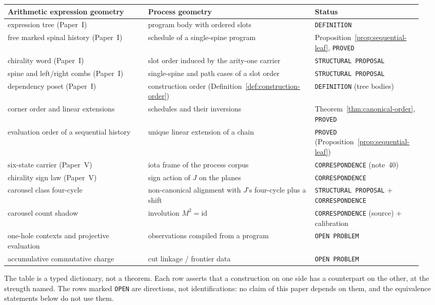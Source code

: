 \begin{center}
\footnotesize
\begin{longtable}{@{}>{\raggedright\arraybackslash}p{0.32\linewidth}>{\raggedright\arraybackslash}p{0.38\linewidth}>{\raggedright\arraybackslash}p{0.24\linewidth}@{}}
\toprule
Arithmetic expression geometry & Process geometry & Status \\
\midrule
expression tree (Paper~I) & program body with ordered slots
  & \texttt{DEFINITION} \\
free marked spinal history (Paper~I) & schedule of a single-spine program
  & Proposition~\ref{prop:sequential-leaf}, \texttt{PROVED} \\
chirality word (Paper~I) & slot order induced by the arity-one carrier
  & \texttt{STRUCTURAL PROPOSAL} \\
spine and left/right combs (Paper~I) & single-spine and path cases of a slot order
  & \texttt{STRUCTURAL PROPOSAL} \\
dependency poset (Paper~I) & construction order (Definition~\ref{def:construction-order})
  & \texttt{DEFINITION} (tree bodies) \\
corner order and linear extensions & schedules and their inversions
  & Theorem~\ref{thm:canonical-order}, \texttt{PROVED} \\
evaluation order of a sequential history & unique linear extension of a chain
  & \texttt{PROVED} (Proposition~\ref{prop:sequential-leaf}) \\
six-state carrier (Paper~V) & iota frame of the process corpus
  & \texttt{CORRESPONDENCE} (note~40) \\
chirality sign law (Paper~V) & sign action of $J$ on the planes
  & \texttt{CORRESPONDENCE} \\
carousel class four-cycle & non-canonical alignment with $J$'s four-cycle plus a shift
  & \texttt{STRUCTURAL PROPOSAL} + \texttt{CORRESPONDENCE} \\
carousel count shadow & involution $M^{2}=\mathrm{id}$
  & \texttt{CORRESPONDENCE} (source) + calibration \\
one-hole contexts and projective evaluation & observations compiled from a program
  & \texttt{OPEN PROBLEM} \\
accumulative commutative charge & cut linkage / frontier data
  & \texttt{OPEN PROBLEM} \\
\bottomrule
\end{longtable}
\end{center}

\begin{remark}\label{rem:reading-table}
The table is a typed dictionary, not a theorem.  Each row asserts that a construction
on one side has a counterpart on the other, at the strength named.  The rows marked
\texttt{OPEN} are directions, not identifications: no claim of this paper depends on
them, and the equivalence statements below do not use them.
\end{remark}

